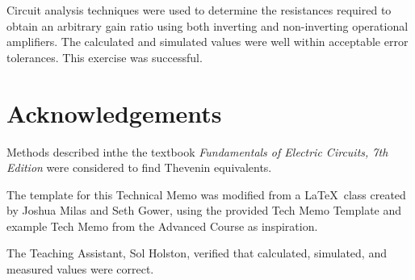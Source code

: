 \documentclass[EEEE]{KGCOEReport}
\begin{document}
Circuit analysis techniques were used to determine the resistances required to
obtain an arbitrary gain ratio using both inverting and non-inverting
operational amplifiers. The calculated and simulated values were well within
acceptable error tolerances. This exercise was successful.

\section{Acknowledgements}

Methods described inthe the textbook \textit{Fundamentals of Electric Circuits,
	7th Edition} \cite{fec} were considered to find Thevenin equivalents.

The template for this Technical Memo was modified from a \LaTeX \ class created
by Joshua Milas and Seth Gower, using the provided Tech Memo Template and
example Tech Memo from the Advanced Course as inspiration.

The Teaching Assistant, Sol Holston, verified that calculated, simulated, and
measured values were correct.

\printbibliography
\end{document}
